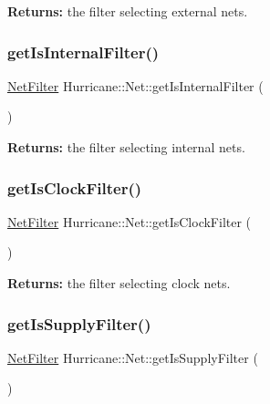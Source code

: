 {\bfseries Returns\+:} the filter selecting external nets. \mbox{\label{classHurricane_1_1Net_a7a2d1c4ab84bf81a16e24557d2342ea5}} 
\subsubsection{\texorpdfstring{get\+Is\+Internal\+Filter()}{getIsInternalFilter()}}
{\footnotesize\ttfamily \mbox{\hyperlink{namespaceHurricane_a0dfd2c5b40325a919d139091312732e9}{Net\+Filter}} Hurricane\+::\+Net\+::get\+Is\+Internal\+Filter (\begin{DoxyParamCaption}{ }\end{DoxyParamCaption})\hspace{0.3cm}{\ttfamily [static]}}

{\bfseries Returns\+:} the filter selecting internal nets. \mbox{\label{classHurricane_1_1Net_afdb2269f3a88923c25264f6f785372a1}} 
\subsubsection{\texorpdfstring{get\+Is\+Clock\+Filter()}{getIsClockFilter()}}
{\footnotesize\ttfamily \mbox{\hyperlink{namespaceHurricane_a0dfd2c5b40325a919d139091312732e9}{Net\+Filter}} Hurricane\+::\+Net\+::get\+Is\+Clock\+Filter (\begin{DoxyParamCaption}{ }\end{DoxyParamCaption})\hspace{0.3cm}{\ttfamily [static]}}

{\bfseries Returns\+:} the filter selecting clock nets. \mbox{\label{classHurricane_1_1Net_ac241f44abf1f332004dd6103ee1dfa48}} 
\subsubsection{\texorpdfstring{get\+Is\+Supply\+Filter()}{getIsSupplyFilter()}}
{\footnotesize\ttfamily \mbox{\hyperlink{namespaceHurricane_a0dfd2c5b40325a919d139091312732e9}{Net\+Filter}} Hurricane\+::\+Net\+::get\+Is\+Supply\+Filter (\begin{DoxyParamCaption}{ }\end{DoxyParamCaption})\hspace{0.3cm}{\ttfamily [static]}}

